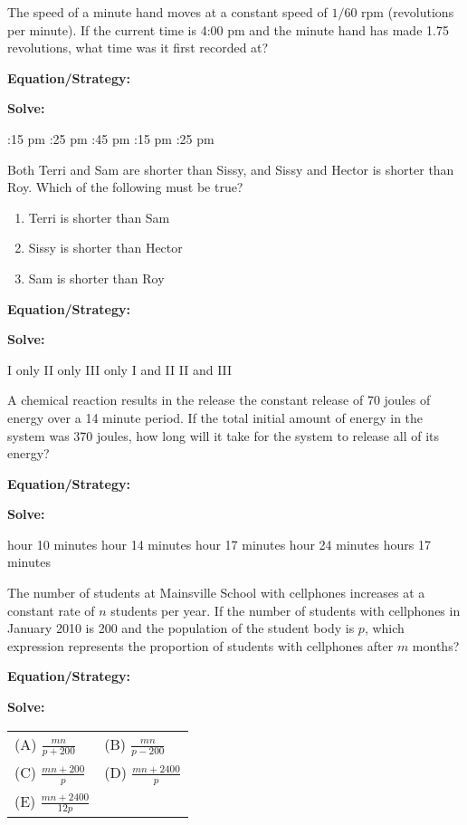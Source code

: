 \vfill
\newpage
\begin{multicols*}{2}
\begin{outline}[enumerate]
\medium

\1 The speed of a minute hand moves at a constant speed of $1/60$ rpm (revolutions per minute). If the current time is 4:00 pm and the minute hand has made 1.75 revolutions, what time was it first recorded at?

\bigskip
\textbf{Equation/Strategy:} \hrulefill

\bigskip
\textbf{Solve:}

\vfill
{}:15 pm
:25 pm
:45 pm
:15 pm
:25 pm

\midline

\1 Both Terri and Sam are shorter than Sissy, and Sissy and Hector is shorter than Roy. Which of the following must be true?

\begin{enumerate}[label=\Roman*.]
\item Terri is shorter than Sam
\item Sissy is shorter than Hector
\item Sam is shorter than Roy
\end{enumerate}

\bigskip
\textbf{Equation/Strategy:} \hrulefill

\bigskip
\textbf{Solve:}

\vfill
\2 I only
\2 II only
\2 III only
\2 I and II
\2 II and III

\columnbreak
\advanced

\1 A chemical reaction results in the release the constant release of 70 joules of energy over a 14 minute period. If the total initial amount of energy in the system was 370 joules, how long will it take for the system to release all of its energy?

\bigskip
\textbf{Equation/Strategy:} \hrulefill

\bigskip
\textbf{Solve:}

\vfill
{} hour 10 minutes
 hour 14 minutes
 hour 17 minutes
 hour 24 minutes
 hours 17 minutes

\midline

\1 The number of students at Mainsville School with cellphones increases at a constant rate of $n$ students per year. If the number of students with cellphones in January 2010 is 200 and the population of the student body is $p$, which expression represents the proportion of students with cellphones after $m$ months?

\bigskip
\textbf{Equation/Strategy:} \hrulefill

\bigskip
\textbf{Solve:}

\vfill
\begin{spacing}{2.75}
\begin{tabularx}{0.4\textwidth}{*2{@{}X}}
(A) $\frac{mn}{p+200}$ & (B) $\frac{mn}{p-200}$\\
(C) $\frac{mn+200}{p}$ & (D) $\frac{mn+2400}{p}$\\
(E) $\frac{mn+2400}{12p}$
\end{tabularx}
\end{spacing}
\end{outline}
\end{multicols*}